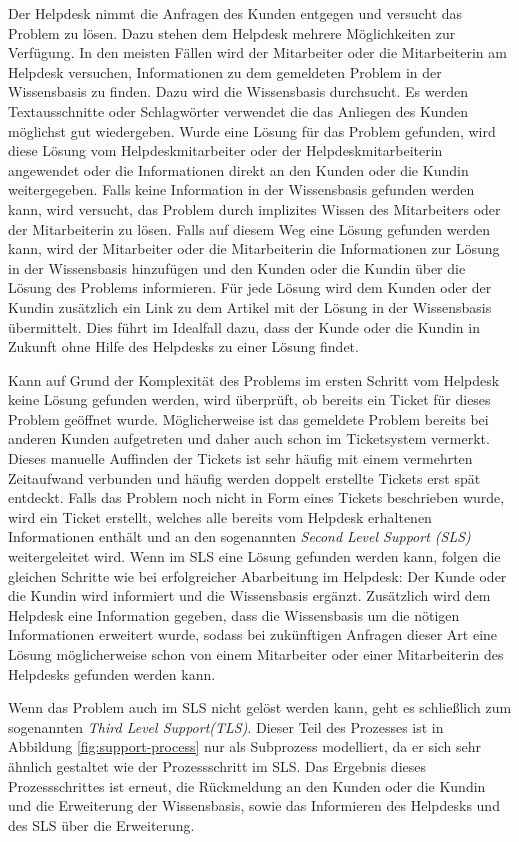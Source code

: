 Der Helpdesk nimmt die Anfragen des Kunden entgegen und versucht das Problem zu lösen. Dazu stehen dem Helpdesk mehrere Möglichkeiten zur Verfügung. In den meisten Fällen wird der Mitarbeiter oder die Mitarbeiterin am Helpdesk versuchen, Informationen zu dem gemeldeten Problem in der Wissensbasis zu finden. Dazu wird die Wissensbasis durchsucht. Es werden Textausschnitte oder Schlagwörter verwendet die das Anliegen des Kunden möglichst gut wiedergeben. Wurde eine Lösung für das Problem gefunden, wird diese Lösung vom Helpdeskmitarbeiter oder der Helpdeskmitarbeiterin angewendet oder die Informationen direkt an den Kunden oder die Kundin weitergegeben. Falls keine Information in der Wissensbasis gefunden werden kann, wird versucht, das Problem durch implizites Wissen des Mitarbeiters oder der Mitarbeiterin zu lösen. Falls auf diesem Weg eine Lösung gefunden werden kann, wird der Mitarbeiter oder die Mitarbeiterin die Informationen zur Lösung in der Wissensbasis hinzufügen und den Kunden oder die Kundin über die Lösung des Problems informieren. Für jede Lösung wird dem Kunden oder der Kundin zusätzlich ein Link zu dem Artikel mit der Lösung in der Wissensbasis übermittelt. Dies führt im Idealfall dazu, dass der Kunde oder die Kundin in Zukunft ohne Hilfe des Helpdesks zu einer Lösung findet.

Kann auf Grund der Komplexität des Problems im ersten Schritt vom Helpdesk keine Lösung gefunden werden, wird überprüft, ob bereits ein Ticket für dieses Problem geöffnet wurde. Möglicherweise ist das gemeldete Problem bereits bei anderen Kunden aufgetreten und daher auch schon im Ticketsystem vermerkt. Dieses manuelle Auffinden der Tickets ist sehr häufig mit einem vermehrten Zeitaufwand verbunden und häufig werden doppelt erstellte Tickets erst spät entdeckt. Falls das Problem noch nicht in Form eines Tickets beschrieben wurde, wird ein Ticket erstellt, welches alle bereits vom Helpdesk erhaltenen Informationen enthält und an den sogenannten \textit{Second Level Support (SLS)} weitergeleitet wird. Wenn im SLS eine Lösung gefunden werden kann, folgen die gleichen Schritte wie bei erfolgreicher Abarbeitung im Helpdesk: Der Kunde oder die Kundin wird informiert und die Wissensbasis ergänzt. Zusätzlich wird dem Helpdesk eine Information gegeben, dass die Wissensbasis um die nötigen Informationen erweitert wurde, sodass bei zukünftigen Anfragen dieser Art eine Lösung möglicherweise schon von einem Mitarbeiter oder einer Mitarbeiterin des Helpdesks gefunden werden kann.

Wenn das Problem auch im SLS nicht gelöst werden kann, geht es schließlich zum sogenannten \textit{Third Level Support(TLS)}. Dieser Teil des Prozesses ist in Abbildung \ref{fig:support-process} nur als Subprozess modelliert, da er sich sehr ähnlich gestaltet wie der Prozessschritt im SLS. Das Ergebnis dieses Prozessschrittes ist erneut, die Rückmeldung an den Kunden oder die Kundin und die Erweiterung der Wissensbasis, sowie das Informieren des Helpdesks und des SLS über die Erweiterung.

